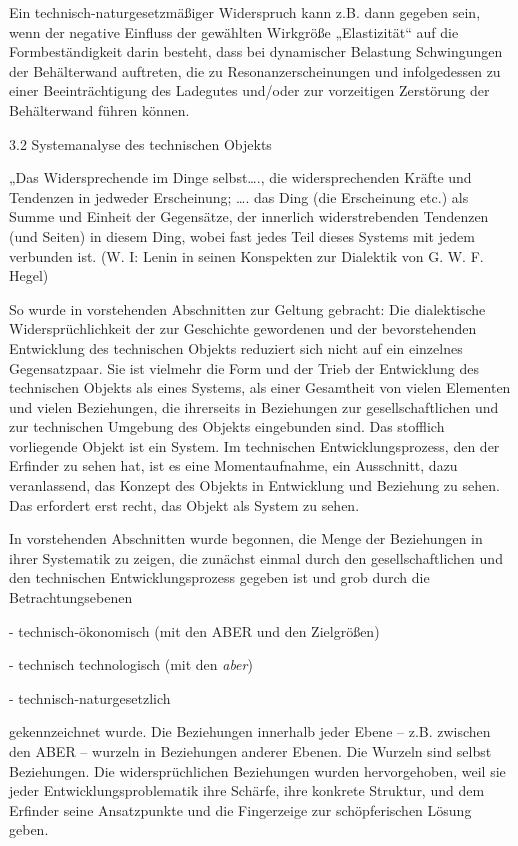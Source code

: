 \documentclass[12pt,a4paper]{article}
\begin{document}
Ein technisch-naturgesetzmäßiger Widerspruch kann z.B. dann gegeben sein, wenn der negative Einfluss der gewählten Wirkgröße „Elastizität“ auf die Formbeständigkeit darin besteht, dass bei dynamischer Belastung Schwingungen der Behälterwand auftreten, die zu Resonanzerscheinungen und infolgedessen zu einer Beeinträchtigung des Ladegutes und/oder zur vorzeitigen Zerstörung der Behälterwand führen können.



3.2  Systemanalyse des technischen Objekts

„Das Widersprechende im Dinge selbst…., die widersprechenden Kräfte und Tendenzen in jedweder Erscheinung; …. das Ding (die Erscheinung etc.) als Summe und Einheit der Gegensätze, der innerlich widerstrebenden Tendenzen (und Seiten) in diesem Ding, wobei fast jedes Teil dieses Systems mit jedem verbunden ist. (W. I: Lenin in seinen Konspekten zur Dialektik von G. W. F. Hegel)

So wurde in vorstehenden Abschnitten zur Geltung gebracht: Die dialektische Widersprüchlichkeit der zur Geschichte gewordenen und der bevorstehenden Entwicklung des technischen Objekts reduziert sich nicht auf ein einzelnes Gegensatzpaar. Sie ist vielmehr die Form und der Trieb der Entwicklung des technischen Objekts als eines Systems, als einer Gesamtheit von vielen Elementen und vielen Beziehungen, die ihrerseits in Beziehungen zur gesellschaftlichen und zur technischen Umgebung des Objekts eingebunden sind. Das stofflich vorliegende Objekt ist ein System. Im technischen Entwicklungsprozess, den der Erfinder zu sehen hat, ist es eine Momentaufnahme, ein Ausschnitt, dazu veranlassend, das Konzept des Objekts in Entwicklung und Beziehung zu sehen. Das erfordert erst recht, das Objekt als System zu sehen.

In vorstehenden Abschnitten wurde begonnen, die Menge der Beziehungen in ihrer Systematik zu zeigen, die zunächst einmal durch den gesellschaftlichen und den technischen Entwicklungsprozess gegeben ist und grob durch die Betrachtungsebenen

- technisch-ökonomisch (mit den ABER und den Zielgrößen)

- technisch technologisch (mit den \emph{aber})

- technisch-naturgesetzlich

gekennzeichnet wurde. Die Beziehungen innerhalb jeder Ebene – z.B. zwischen den ABER – wurzeln in Beziehungen anderer Ebenen. Die Wurzeln sind selbst Beziehungen. Die widersprüchlichen Beziehungen wurden hervorgehoben, weil sie jeder Entwicklungsproblematik ihre Schärfe, ihre konkrete Struktur, und dem Erfinder seine Ansatzpunkte und die Fingerzeige zur schöpferischen Lösung geben.
\end{document}
